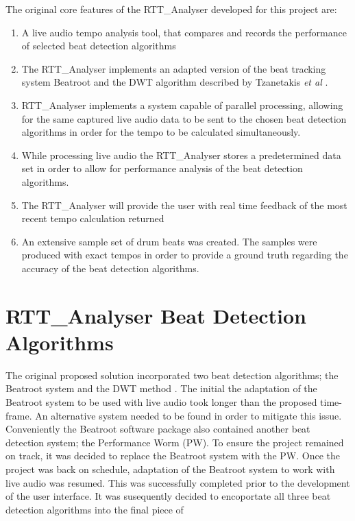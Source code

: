 \documentclass[a4paper, 11pt]{article}
\begin{document}
The original core features of the RTT\_Analyser developed for this project are:

\begin{enumerate}
\item A live audio tempo analysis tool, that compares and records the performance of selected beat detection algorithms
\item The RTT\_Analyser implements an adapted version of the beat tracking system Beatroot and the DWT algorithm described by Tzanetakis \textit{et al} \cite{tzane1}.
\item RTT\_Analyser implements a system capable of parallel processing, allowing for the same captured live audio data to be sent to the chosen beat detection algorithms in order for the tempo to be calculated simultaneously.
\item While processing live audio the RTT\_Analyser stores a predetermined data set in order to allow for performance analysis of the beat detection algorithms.
\item The RTT\_Analyser will provide the user with real time feedback of the most recent tempo calculation returned
\item An extensive sample set of drum beats was created. The samples were produced with exact tempos in order to provide a ground truth regarding the accuracy of the beat detection algorithms. 
\end{enumerate}



\maketitle{}\section{RTT\_Analyser Beat Detection Algorithms}
The original proposed solution incorporated two beat detection algorithms; the Beatroot system \cite{dixon1} and the DWT method \cite{tzane1}. The initial the adaptation of the Beatroot system to be used with live audio took longer than the proposed time-frame. An alternative system needed to be found in order to mitigate this issue. Conveniently the Beatroot software package also contained another beat detection system; the Performance Worm (PW)\cite{dixon3}. To ensure the project remained on track, it was decided to replace the Beatroot system with the PW. Once the project was back on schedule, adaptation of the Beatroot system to work with live audio was resumed. This was successfully completed prior to the development of the user interface. It was susequently decided to encoportate all three beat detection algorithms into the final piece of
\end{document}
